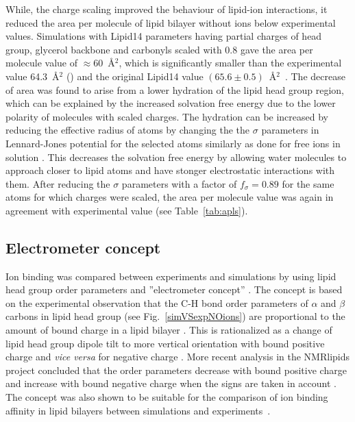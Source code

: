 \documentclass[aip,jcp,twocolumn]{revtex4}
\begin{document}
While, the charge scaling improved the behaviour of lipid-ion interactions,
it reduced the area per molecule of lipid bilayer without ions below experimental
values. Simulations with Lipid14 parameters having partial charges of head group, glycerol
backbone and carbonyls scaled with 0.8 gave the area per molecule value of $\approx$60~\AA$^2$,
which is significantly smaller than the experimental value 64.3~\AA$^2$ (\cite{})
and the original Lipid14 value $(65.6 \pm 0.5)$~\AA$^2$~\cite{dickson14}.
The decrease of area was found to arise from a lower hydration of the lipid head group region,
which can be explained by the increased solvation free energy due to the lower polarity
of molecules with scaled charges. The hydration can be increased
by reducing the effective radius of atoms by changing the 
the $\sigma$ parameters in Lennard-Jones potential for the selected atoms
similarly as done for free ions in solution \cite{kohagen14,kohagen16,Pluharova2014}.
This decreases the solvation free energy by allowing water molecules to
approach closer to lipid atoms and have stonger electrostatic interactions with them.
After reducing the $\sigma$ parameters with a factor of $f_\sigma = 0.89$
for the same atoms for which charges were scaled, the area per molecule value was
again in agreement with experimental value (see Table~\ref{tab:apls}). 


\subsection{Electrometer concept} \label{section:electrometer}
Ion binding was compared between experiments and simulations by 
using lipid head group order parameters and 
''electrometer concept'' \cite{seelig87,catte16}.
The concept is based on the experimental observation that the C-H bond
order parameters of $\alpha$ and $\beta$ carbons in lipid head group
(see Fig.~\ref{simVSexpNOions}) are proportional to the amount 
of bound charge in a lipid bilayer \cite{seelig87}.
This is rationalized as a change of lipid head group dipole tilt to more vertical orientation
with bound positive charge and {\it vice versa} for negative charge \cite{seelig87}. 
More recent analysis in the NMRlipids project concluded 
that the order parameters decrease with bound positive charge 
and increase with bound negative charge when the signs are taken 
in account \cite{ollila16,catte16}. The concept was also shown
to be suitable for the comparison of ion binding affinity in lipid 
bilayers between simulations and experiments~\cite{catte16}.
 
\end{document}
